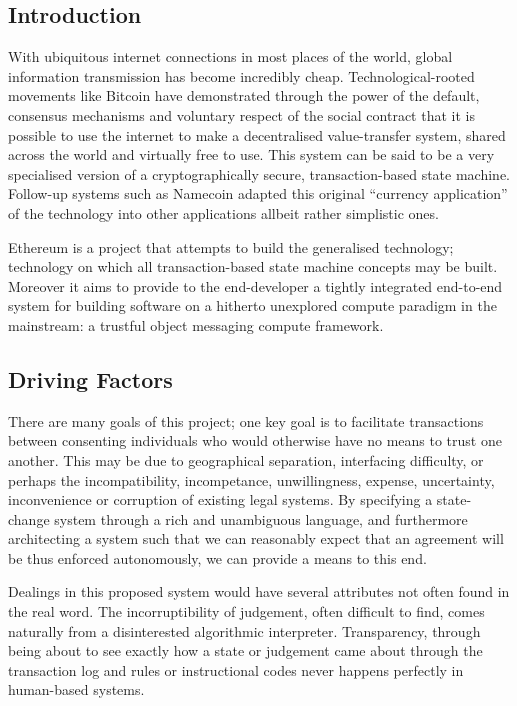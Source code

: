 \documentclass[9pt,oneside]{amsart}
\begin{document}
\setlength{\columnsep}{20pt}
\begin{multicols}{2}

\section{Introduction}\label{sec:introduction}

With ubiquitous internet connections in most places of the world, global information transmission has become incredibly cheap. Technological-rooted movements like Bitcoin have demonstrated through the power of the default, consensus mechanisms and voluntary respect of the social contract that it is possible to use the internet to make a decentralised value-transfer system, shared across the world and virtually free to use. This system can be said to be a very specialised version of a cryptographically secure, transaction-based state machine. Follow-up systems such as Namecoin adapted this original ``currency application'' of the technology into other applications allbeit rather simplistic ones.

Ethereum is a project that attempts to build the generalised technology; technology on which all transaction-based state machine concepts may be built. Moreover it aims to provide to the end-developer a tightly integrated end-to-end system for building software on a hitherto unexplored compute paradigm in the mainstream: a trustful object messaging compute framework.

\subsection{Driving Factors} \label{ch:driving}

There are many goals of this project; one key goal is to facilitate transactions between consenting individuals who would otherwise have no means to trust one another. This may be due to geographical separation, interfacing difficulty, or perhaps the incompatibility, incompetance, unwillingness, expense, uncertainty, inconvenience or corruption of existing legal systems. By specifying a state-change system through a rich and unambiguous language, and furthermore architecting a system such that we can reasonably expect that an agreement will be thus enforced autonomously, we can provide a means to this end.

Dealings in this proposed system would have several attributes not often found in the real word. The incorruptibility of judgement, often difficult to find, comes naturally from a disinterested algorithmic interpreter. Transparency, through being about to see exactly how a state or judgement came about through the transaction log and rules or instructional codes never happens perfectly in human-based systems.


\end{multicols}
\end{document}
